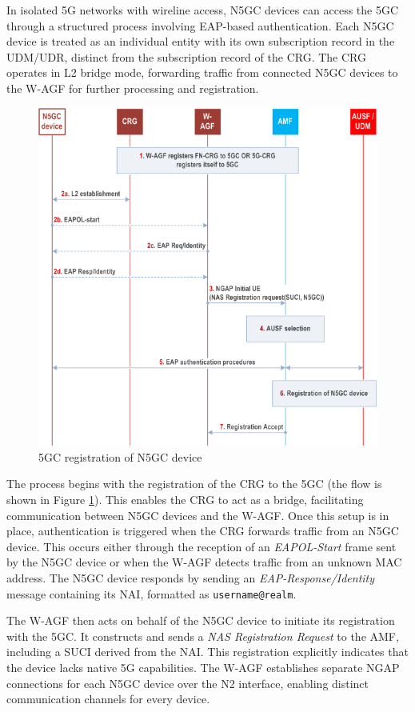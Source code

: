 In isolated \ac{5G} networks with wireline access, \ac{N5GC} devices can access the \ac{5GC} through a structured process involving \ac{EAP}-based authentication. Each \ac{N5GC} device is treated as an individual entity with its own subscription record in the \ac{UDM}/\ac{UDR}, distinct from the subscription record of the \ac{CRG}. The \ac{CRG} operates in L2 bridge mode, forwarding traffic from connected \ac{N5GC} devices to the \ac{W-AGF} for further processing and registration.

\begin{figure}
    \centering
    \includegraphics[width=0.75\linewidth]{figs/5GC registration of Non-5GC device.png}
    \caption{\ac{5GC} registration of \ac{N5GC} device}
    \label{fig:5GC registration of Non-5GC device}
\end{figure}

The process begins with the registration of the \ac{CRG} to the \ac{5GC} (the flow is shown in Figure \ref{fig:5GC registration of Non-5GC device}). This enables the \ac{CRG} to act as a bridge, facilitating communication between \ac{N5GC} devices and the \ac{W-AGF}. Once this setup is in place, authentication is triggered when the \ac{CRG} forwards traffic from an \ac{N5GC} device. This occurs either through the reception of an \textit{\ac{EAPOL}-Start} frame sent by the \ac{N5GC} device or when the \ac{W-AGF} detects traffic from an unknown \ac{MAC} address. The \ac{N5GC} device responds by sending an \textit{\ac{EAP}-Response/Identity} message containing its \ac{NAI}, formatted as \texttt{username@realm}.

The \ac{W-AGF} then acts on behalf of the \ac{N5GC} device to initiate its registration with the \ac{5GC}. It constructs and sends a \textit{\ac{NAS} Registration Request} to the \ac{AMF}, including a \ac{SUCI} derived from the \ac{NAI}. This registration explicitly indicates that the device lacks native \ac{5G} capabilities. The \ac{W-AGF} establishes separate \ac{NGAP} connections for each \ac{N5GC} device over the N2 interface, enabling distinct communication channels for every device.

